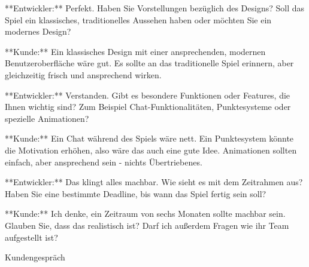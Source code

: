 \begin{prompt}[H]
\begin{tcolorbox}[colback=gray!20, colframe=gray!20, boxrule=0pt, sharp corners]
        **Entwickler:** Perfekt. Haben Sie Vorstellungen bezüglich des Designs? Soll das Spiel ein klassisches, traditionelles Aussehen haben oder möchten Sie ein modernes Design?
        
        **Kunde:** Ein klassisches Design mit einer ansprechenden, modernen Benutzeroberfläche wäre gut. Es sollte an das traditionelle Spiel erinnern, aber gleichzeitig frisch und ansprechend wirken.
        
        **Entwickler:** Verstanden. Gibt es besondere Funktionen oder Features, die Ihnen wichtig sind? Zum Beispiel Chat-Funktionalitäten, Punktesysteme oder spezielle Animationen?
        
        **Kunde:** Ein Chat während des Spiels wäre nett. Ein Punktesystem könnte die Motivation erhöhen, also wäre das auch eine gute Idee. Animationen sollten einfach, aber ansprechend sein - nichts Übertriebenes.
        
        **Entwickler:** Das klingt alles machbar. Wie sieht es mit dem Zeitrahmen aus? Haben Sie eine bestimmte Deadline, bis wann das Spiel fertig sein soll?
        
        **Kunde:** Ich denke, ein Zeitraum von sechs Monaten sollte machbar sein. Glauben Sie, dass das realistisch ist? Darf ich außerdem Fragen wie ihr Team aufgestellt ist?
        \vfill
    \end{tcolorbox}
    \caption{Kundengespräch}
    \label{Kundengespräch1}
\end{prompt}

